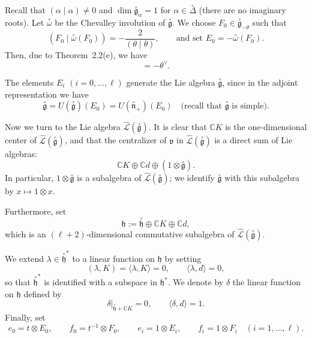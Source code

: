 \documentclass[12pt]{article}
\begin{document}
Recall that $(\alpha\mid\alpha) \neq 0$ and
$\dim \overset{\circ}{\mathfrak{g}}_\alpha = 1$ for $\alpha \in \overset{\circ}{\Delta}$
(there are no imaginary roots).
Let $\overset{\circ}{\omega}$ be the Chevalley involution of $\overset{\circ}{\mathfrak{g}}$.
We choose $F_0 \in \overset{\circ}{\mathfrak{g}}_{-\theta}$ such that
\[
    (F_0 \mid \overset{\circ}{\omega}(F_0)) = -\frac{2}{(\theta\mid\theta)},
    \qquad\text{and set } E_0 = -\overset{\circ}{\omega}(F_0).
\]
Then, due to Theorem~2.2(e), we have
\begin{equation}
    [E_0, F_0] = -\theta^\vee.
    \tag{7.4.1}
\end{equation}

The elements $E_i$ $(i = 0, \dots, \ell)$ generate the Lie algebra $\overset{\circ}{\mathfrak{g}}$, since in the adjoint representation we have
\[
    \overset{\circ}{\mathfrak{g}} = U(\overset{\circ}{\mathfrak{g}})(E_0)
    = U(\overset{\circ}{\mathfrak{n}}_+)(E_0)
    \quad\text{(recall that $\overset{\circ}{\mathfrak{g}}$ is simple).}
\]

\medskip

Now we turn to the Lie algebra $\widehat{\mathcal{L}}(\overset{\circ}{\mathfrak{g}})$.
It is clear that $\mathbb{C}K$ is the one-dimensional center of $\widehat{\mathcal{L}}(\overset{\circ}{\mathfrak{g}})$,
and that the centralizer of $\mathfrak{v}$ in
$\widehat{\mathcal{L}}(\overset{\circ}{\mathfrak{g}})$
is a direct sum of Lie algebras:
\[
    \mathbb{C}K \oplus \mathbb{C}d \oplus (1 \otimes \overset{\circ}{\mathfrak{g}}).
\]
In particular, $1 \otimes \overset{\circ}{\mathfrak{g}}$ is a subalgebra of
$\widehat{\mathcal{L}}(\overset{\circ}{\mathfrak{g}})$; we identify
$\overset{\circ}{\mathfrak{g}}$ with this subalgebra by $x \mapsto 1 \otimes x$.

\medskip

Furthermore, set
\[
    \mathfrak{h} := \overset{\circ}{\mathfrak{h}} \oplus \mathbb{C}K \oplus \mathbb{C}d,
\]
which is an $(\ell+2)$-dimensional commutative subalgebra of
$\widehat{\mathcal{L}}(\overset{\circ}{\mathfrak{g}})$.

We extend $\lambda \in \overset{\circ}{\mathfrak{h}}^*$ to a linear function on $\mathfrak{h}$
by setting
\[
    (\lambda, K) = \langle \lambda, K \rangle = 0,
    \qquad
    \langle \lambda, d \rangle = 0,
\]
so that $\overset{\circ}{\mathfrak{h}}^*$ is identified with a subspace in $\mathfrak{h}^*$.
We denote by $\delta$ the linear function on $\mathfrak{h}$ defined by
\[
    \delta|_{\overset{\circ}{\mathfrak{h}} + \mathbb{C}K} = 0,
    \qquad
    \langle \delta, d \rangle = 1.
\]
Finally, set
\[
    e_0 = t \otimes E_0, \qquad
    f_0 = t^{-1} \otimes F_0, \qquad
    e_i = 1 \otimes E_i, \qquad
    f_i = 1 \otimes F_i \quad (i = 1, \dots, \ell).
\]
\end{document}
